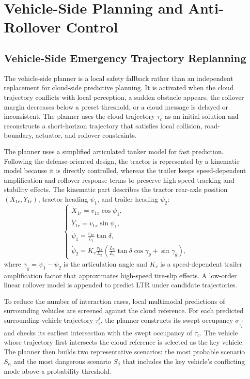 \section{Vehicle-Side Planning and Anti-Rollover Control}

\subsection{Vehicle-Side Emergency Trajectory Replanning}

The vehicle-side planner is a local safety fallback rather than an independent replacement for cloud-side predictive planning. It is activated when the cloud trajectory conflicts with local perception, a sudden obstacle appears, the rollover margin decreases below a preset threshold, or a cloud message is delayed or inconsistent. The planner uses the cloud trajectory $\tau_c$ as an initial solution and reconstructs a short-horizon trajectory that satisfies local collision, road-boundary, actuator, and rollover constraints.

The planner uses a simplified articulated tanker model for fast prediction. Following the defense-oriented design, the tractor is represented by a kinematic model because it is directly controlled, whereas the trailer keeps speed-dependent amplification and rollover-response terms to preserve high-speed tracking and stability effects. The kinematic part describes the tractor rear-axle position $(X_{1r},Y_{1r})$, tractor heading $\psi_1$, and trailer heading $\psi_2$:
\begin{equation}
\begin{cases}
\dot{X}_{1r}=v_{1x}\cos\psi_1,\\
\dot{Y}_{1r}=v_{1x}\sin\psi_1,\\
\dot{\psi}_1=\frac{v_{1x}}{L_1}\tan\delta,\\
\dot{\psi}_2=K_v\frac{v_{1x}}{L_2}
\left(\frac{L_h}{L_1}\tan\delta\cos\gamma_g+\sin\gamma_g\right),
\end{cases}
\label{eq:vehicle_planning_model}
\end{equation}
where $\gamma_g=\psi_1-\psi_2$ is the articulation angle and $K_v$ is a speed-dependent trailer amplification factor that approximates high-speed tire-slip effects. A low-order linear rollover model is appended to predict LTR under candidate trajectories.

To reduce the number of interaction cases, local multimodal predictions of surrounding vehicles are screened against the cloud reference. For each predicted surrounding-vehicle trajectory $\tau_i^j$, the planner constructs its swept occupancy $\sigma_{\tau_i^j}$ and checks its earliest intersection with the swept occupancy of $\tau_c$. The vehicle whose trajectory first intersects the cloud reference is selected as the key vehicle. The planner then builds two representative scenarios: the most probable scenario $S_\alpha$ and the most dangerous scenario $S_\beta$ that includes the key vehicle's conflicting mode above a probability threshold.


